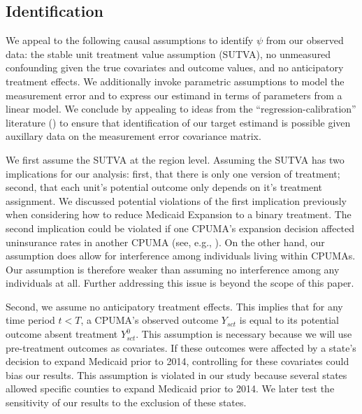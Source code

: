 \documentclass[aoas]{imsart}
\theoremstyle{plain}
\theoremstyle{remark}
\begin{document}
\subsection{Identification} \label{ssec:identification}

We appeal to the following causal assumptions to identify $\psi$ from our observed data: the stable unit treatment value assumption (SUTVA), no unmeasured confounding given the true covariates and outcome values, and no anticipatory treatment effects. We additionally invoke parametric assumptions to model the measurement error and to express our estimand in terms of parameters from a linear model. We conclude by appealing to ideas from the ``regression-calibration'' literature (\cite{gleser1992importance}) to ensure that identification of our target estimand is possible given auxillary data on the measurement error covariance matrix.

We first assume the SUTVA at the region level. Assuming the SUTVA has two implications for our analysis: first, that there is only one version of treatment; second, that each unit's potential outcome only depends on it's treatment assignment. We discussed potential violations of the first implication previously when considering how to reduce Medicaid Expansion to a binary treatment. The second implication could be violated if one CPUMA's expansion decision affected uninsurance rates in another CPUMA (see, e.g., \cite{frean2017premium}). On the other hand, our assumption does allow for interference among individuals living within CPUMAs. Our assumption is therefore weaker than assuming no interference among any individuals at all. Further addressing this issue is beyond the scope of this paper.

Second, we assume no anticipatory treatment effects. This implies that for any time period $t < T$, a CPUMA's observed outcome $Y_{sct}$ is equal to its potential outcome absent treatment $Y_{sct}^0$. This assumption is necessary because we will use pre-treatment outcomes as covariates. If these outcomes were affected by a state's decision to expand Medicaid prior to 2014, controlling for these covariates could bias our results. This assumption is violated in our study because several states allowed specific counties to expand Medicaid prior to 2014. We later test the sensitivity of our results to the exclusion of these states.
\end{document}
